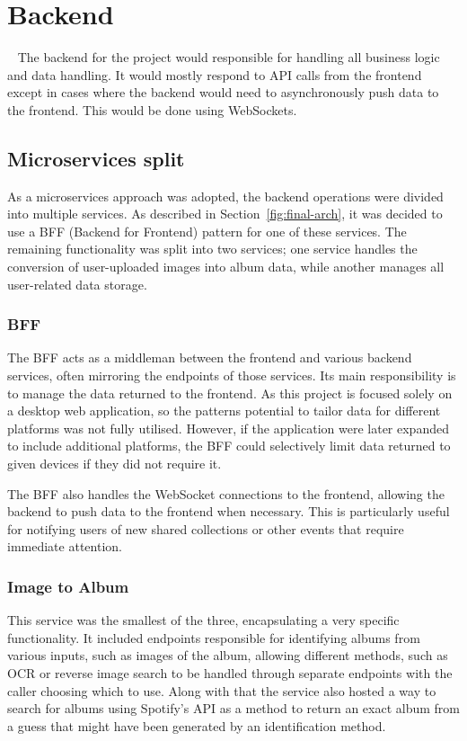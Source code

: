\section{Backend}~\label{sec:backend-design}
The backend for the project would responsible for handling all business logic and data handling. It would mostly respond to API calls from the frontend except in cases where the backend would need to asynchronously push data to the frontend. This would be done using WebSockets.

\subsection{Microservices split}
As a microservices approach was adopted, the backend operations were divided into multiple services. As described in Section~\ref{fig:final-arch}, it was decided to use a BFF (Backend for Frontend) pattern for one of these services. The remaining functionality was split into two services; one service handles the conversion of user-uploaded images into album data, while another manages all user-related data storage.

\subsubsection{BFF}
The BFF acts as a middleman between the frontend and various backend services, often mirroring the endpoints of those services. Its main responsibility is to manage the data returned to the frontend. As this project is focused solely on a desktop web application, so the patterns potential to tailor data for different platforms was not fully utilised. However, if the application were later expanded to include additional platforms, the BFF could selectively limit data returned to given devices if they did not require it.

The BFF also handles the WebSocket connections to the frontend, allowing the backend to push data to the frontend when necessary. This is particularly useful for notifying users of new shared collections or other events that require immediate attention.

\subsubsection{Image to Album}
This service was the smallest of the three, encapsulating a very specific functionality. It included endpoints responsible for identifying albums from various inputs, such as images of the album, allowing different methods, such as OCR or reverse image search to be handled through separate endpoints with the caller choosing which to use. Along with that the service also hosted a way to search for albums using Spotify's API as a method to return an exact album from a guess that might have been generated by an identification method.

